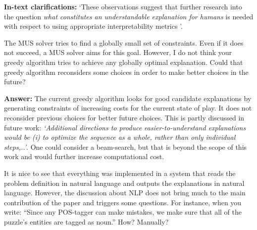 \documentclass{article}
\newcommand\comment[1]{\marginpar{\tiny #1}}
\renewcommand\comment[1]{#1}
\newcommand{\tias}[1]{{\comment{\color{blue}\textsc{TG:}#1}}}
\newcommand{\emilio}[1]{{\comment{\color{red} \textsc{EG:}#1}}}
\newcommand{\answer}[1]{{\comment{\textbf{Answer:} #1}}}
\newcommand{\clarification}[1]{{\comment{\textbf{In-text clarifications:} #1}}}
\begin{document}
	\clarification{
		`These observations suggest that further research into the question \emph{what constitutes an understandable explanation for humans} is needed with respect to using appropriate interpretability metrics \cite{hoffman2018metrics,rosenfeld2021better}'.
} 


\begin{quoteit}
The MUS solver tries to find a globally small set of constraints. Even if it does not succeed, a MUS solver aims for this goal. However, I do not think your greedy algorithm tries to achieve any globally optimal explanation.
Could that greedy algorithm reconsiders some choices in order to make better choices in the future?
\end{quoteit}

\answer{The current greedy algorithm looks for good candidate explanations by generating constraints of increasing costs for the current state of play. It does not reconsider previous choices for better future choices. This is partly discussed in future work: \emph{`Additional directions to produce easier-to-understand explanations would be \emph{(i)} to  optimize the sequence as a whole, rather than only individual steps,..'}. One could consider a beam-search, but that is beyond the scope of this work and would further increase computational cost.}

\begin{quoteit}
It is nice to see that everything was implemented in a system that reads the problem definition in natural language and outputs the explanations in natural language. However, the discussion about NLP does not bring much to the main contribution of the paper and triggers some questions.
For instance, when you write: ``Since any POS-tagger can make mistakes, we make sure that all of the puzzle's entities are tagged as noun.'' How? Manually?
\end{quoteit}
\end{document}
